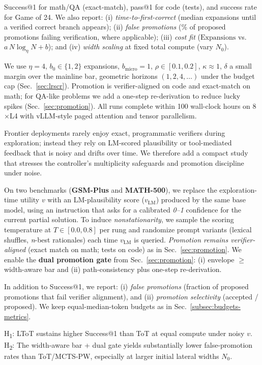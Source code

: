 \documentclass{article}
\begin{document}
Success@1 for math/QA (exact-match), pass@1 for code (tests), and success rate for Game of 24.
We also report:
(i) \emph{time-to-first-correct} (median expansions until a verified correct branch appears);
(ii) \emph{false promotions} (\% of proposed promotions failing verification, where applicable);
(iii) \emph{cost fit} ($\mathrm{Expansions}$ vs.\ $a\,N\log_\eta N + b$); and
(iv) \emph{width scaling} at fixed total compute (vary $N_0$).

We use $\eta{=}4$, $b_0{\in}\{1,2\}$ expansions, $b_{\text{micro}}{=}1$, $\rho{\in}[0.1,0.2]$, $\kappa{\approx}1$, $\delta$ a small margin over the mainline bar, geometric horizons $(1,2,4,\dots)$ under the budget cap (Sec.~\ref{sec:lrscr}).
Promotion is verifier-aligned on code and exact-match on math; for QA-like problems we add a one-step re-derivation to reduce lucky spikes (Sec.~\ref{sec:promotion}).
All runs complete within 100 wall-clock hours on 8$\times$L4 with vLLM-style paged attention and tensor parallelism.

Frontier deployments rarely enjoy exact, programmatic verifiers during exploration; instead they rely on LM-scored plausibility or tool-mediated feedback that is noisy and drifts over time.
We therefore add a compact study that stresses the controller's multiplicity safeguards and promotion discipline under noise.

On two benchmarks (\textbf{GSM-Plus} and \textbf{MATH-500}), we replace the exploration-time utility $v$ with an LM-plausibility score ($v_{\text{LM}}$) produced by the same base model, using an instruction that asks for a calibrated \emph{0--1} confidence for the current partial solution.
To induce \emph{nonstationarity}, we sample the scoring temperature at $T{\in}[0.0,0.8]$ per rung and randomize prompt variants (lexical shuffles, \emph{n}-best rationales) each time $v_{\text{LM}}$ is queried.
\emph{Promotion remains verifier-aligned} (exact match on math; tests on code) as in Sec.~\ref{sec:promotion}.
We enable the \textbf{dual promotion gate} from Sec.~\ref{sec:promotion}: (i) envelope $\ge$ width-aware bar and (ii) path-consistency plus one-step re-derivation.

In addition to Success@1, we report: (i) \emph{false promotions} (fraction of proposed promotions that fail verifier alignment), and (ii) \emph{promotion selectivity} (accepted / proposed).
We keep equal-median-token budgets as in Sec.~\ref{subsec:budgets-metrics}.

H\textsubscript{1}: LToT sustains higher Success@1 than ToT at equal compute under noisy $v$.
H\textsubscript{2}: The width-aware bar + dual gate yields substantially lower false-promotion rates than ToT/MCTS-PW, especially at larger initial lateral widths $N_0$.
\end{document}

